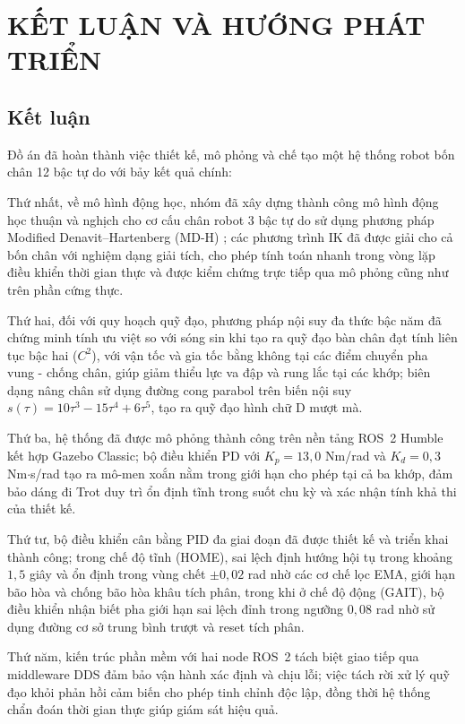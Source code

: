 \chapter{KẾT LUẬN VÀ HƯỚNG PHÁT TRIỂN}

\section{Kết luận}

Đồ án đã hoàn thành việc thiết kế, mô phỏng và chế tạo một hệ thống robot bốn chân 12 bậc tự do với bảy kết quả chính:

Thứ nhất, về mô hình động học, nhóm đã xây dựng thành công mô hình động học thuận và nghịch cho cơ cấu chân robot 3 bậc tự do sử dụng phương pháp Modified Denavit--Hartenberg (MD-H) \cite{denavit1955}; các phương trình IK đã được giải cho cả bốn chân với nghiệm dạng giải tích, cho phép tính toán nhanh trong vòng lặp điều khiển thời gian thực và được kiểm chứng trực tiếp qua mô phỏng cũng như trên phần cứng thực. 

Thứ hai, đối với quy hoạch quỹ đạo, phương pháp nội suy đa thức bậc năm đã chứng minh tính ưu việt so với sóng sin khi tạo ra quỹ đạo bàn chân đạt tính liên tục bậc hai ($C^2$), với vận tốc và gia tốc bằng không tại các điểm chuyển pha vung - chống chân, giúp giảm thiểu lực va đập và rung lắc tại các khớp; biên dạng nâng chân sử dụng đường cong parabol trên biến nội suy $s(\tau) = 10\tau^3 - 15\tau^4 + 6\tau^5$, tạo ra quỹ đạo hình chữ D mượt mà. 

Thứ ba, hệ thống đã được mô phỏng thành công trên nền tảng ROS~2 Humble kết hợp Gazebo Classic; bộ điều khiển PD với $K_p = 13{,}0$ Nm/rad và $K_d = 0{,}3$ Nm$\cdot$s/rad tạo ra mô-men xoắn nằm trong giới hạn cho phép tại cả ba khớp, đảm bảo dáng đi Trot duy trì ổn định tĩnh trong suốt chu kỳ và xác nhận tính khả thi của thiết kế. 

Thứ tư, bộ điều khiển cân bằng PID đa giai đoạn đã được thiết kế và triển khai thành công; trong chế độ tĩnh (HOME), sai lệch định hướng hội tụ trong khoảng $1{,}5$ giây và ổn định trong vùng chết $\pm 0{,}02$ rad nhờ các cơ chế lọc EMA, giới hạn bão hòa và chống bão hòa khâu tích phân, trong khi ở chế độ động (GAIT), bộ điều khiển nhận biết pha giới hạn sai lệch đỉnh trong ngưỡng $0{,}08$ rad nhờ sử dụng đường cơ sở trung bình trượt và reset tích phân. 

Thứ năm, kiến trúc phần mềm với hai node ROS~2 tách biệt giao tiếp qua middleware DDS đảm bảo vận hành xác định và chịu lỗi; việc tách rời xử lý quỹ đạo khỏi phản hồi cảm biến cho phép tinh chỉnh độc lập, đồng thời hệ thống chẩn đoán thời gian thực giúp giám sát hiệu quả. 

